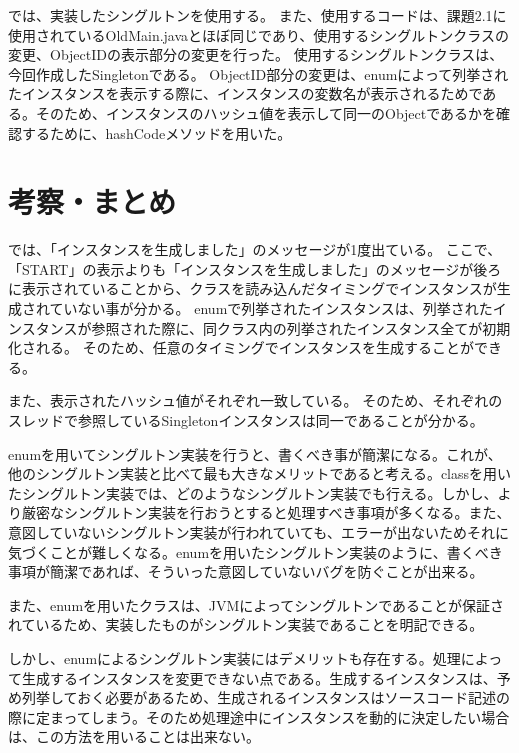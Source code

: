 \documentclass[uplatex]{jsarticle}
\begin{document}
では、実装したシングルトンを使用する。
また、使用するコードは、課題2.1に使用されているOldMain.javaとほぼ同じであり、使用するシングルトンクラスの変更、ObjectIDの表示部分の変更を行った。
使用するシングルトンクラスは、今回作成したSingletonである。
ObjectID部分の変更は、enumによって列挙されたインスタンスを表示する際に、インスタンスの変数名が表示されるためである。そのため、インスタンスのハッシュ値を表示して同一のObjectであるかを確認するために、hashCodeメソッドを用いた。


\section{考察・まとめ}
では、「インスタンスを生成しました」のメッセージが1度出ている。
ここで、「START」の表示よりも「インスタンスを生成しました」のメッセージが後ろに表示されていることから、クラスを読み込んだタイミングでインスタンスが生成されていない事が分かる。
enumで列挙されたインスタンスは、列挙されたインスタンスが参照された際に、同クラス内の列挙されたインスタンス全てが初期化される。
そのため、任意のタイミングでインスタンスを生成することができる。

また、表示されたハッシュ値がそれぞれ一致している。
そのため、それぞれのスレッドで参照しているSingletonインスタンスは同一であることが分かる。

enumを用いてシングルトン実装を行うと、書くべき事が簡潔になる。これが、他のシングルトン実装と比べて最も大きなメリットであると考える。classを用いたシングルトン実装では、どのようなシングルトン実装でも行える。しかし、より厳密なシングルトン実装を行おうとすると処理すべき事項が多くなる。また、意図していないシングルトン実装が行われていても、エラーが出ないためそれに気づくことが難しくなる。enumを用いたシングルトン実装のように、書くべき事項が簡潔であれば、そういった意図していないバグを防ぐことが出来る。

また、enumを用いたクラスは、JVMによってシングルトンであることが保証されているため、実装したものがシングルトン実装であることを明記できる。

しかし、enumによるシングルトン実装にはデメリットも存在する。処理によって生成するインスタンスを変更できない点である。生成するインスタンスは、予め列挙しておく必要があるため、生成されるインスタンスはソースコード記述の際に定まってしまう。そのため処理途中にインスタンスを動的に決定したい場合は、この方法を用いることは出来ない。

\end{document}
